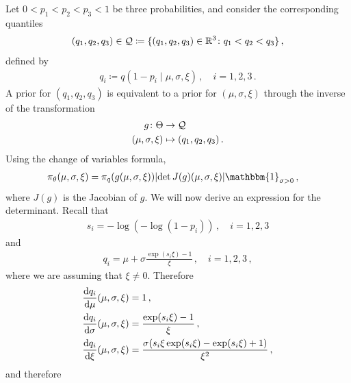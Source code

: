 \documentclass{article}
\DeclarePairedDelimiter\abs{\lvert}{\rvert}
\newcommand{\R}{\mathbb{R}}
\newcommand{\dd}{{\rm d}}
\begin{document}
%
Let $0 < p_1 < p_2 < p_3 < 1$ be three probabilities,
and consider the corresponding quantiles
%
\begin{align*}
	(q_1, q_2, q_3) \in {\cal Q}
		\coloneqq \{(q_1, q_2, q_3) \in \R^3 \colon q_1 < q_2 < q_3\} \,,
	\label{eq:Q}
\end{align*}
%
defined by
%
\begin{align}
	q_i \coloneqq q(1 - p_i \mid \mu, \sigma, \xi)\,, \quad i = 1, 2, 3 \,.
\end{align}
%
A prior for $(q_1, q_2, q_3)$ is equivalent to a prior for $(\mu, \sigma, \xi)$
through the inverse of the transformation
%
\begin{align*}
	g \colon \Theta &\to {\cal Q} \\
	(\mu, \sigma, \xi) &\mapsto (q_{1}, q_{2}, q_{3}) \,.
\end{align*}
%
Using the change of variables formula,
%
\begin{align}
	\pi_\theta(\mu, \sigma, \xi)
		&= \pi_q(g(\mu, \sigma, \xi)) \abs{\det{J(g)(\mu, \sigma, \xi)}}
		\mathbbm{1}_{\sigma > 0} \,,
	\label{eq:change-of-variables-1}
\end{align}
%
where $J(g)$ is the Jacobian of $g$.
We will now derive an expression for the determinant. Recall that
%
\begin{align*}
	s_i = -\log(-\log(1 - p_i)) \,, \quad i = 1, 2, 3 
\end{align*}
%
and
%
\begin{align}
	q_i = \mu + \sigma \frac{\exp(s_i \xi) - 1}{\xi} \,, \quad i = 1, 2, 3 \,,
\end{align}
%
where we are assuming that $\xi \neq 0$. Therefore
%
\begin{align*}
	\frac{\dd q_{i}}{\dd \mu}(\mu, \sigma, \xi)
		&= 1 \,,\\
	\frac{\dd q_{i}}{\dd \sigma}(\mu, \sigma, \xi)
		&= \frac{\exp(s_i \xi) - 1}{\xi} \,,\\
	\frac{\dd q_{i}}{\dd \xi}(\mu, \sigma, \xi)
		&= \frac{\sigma(s_i \xi \exp(s_i \xi) -\exp(s_i \xi) + 1)}{\xi ^ 2} \,,
\end{align*}
%
and therefore
%
\end{document}
